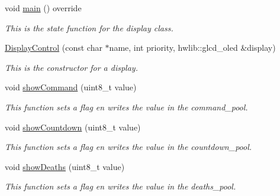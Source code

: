 \begin{DoxyCompactItemize}
void \mbox{\hyperlink{class_display_control_a9707c32249e0a648afc2def818900f30}{main}} () override
\begin{DoxyCompactList}\small\item\em This is the state function for the display class. \end{DoxyCompactList}\item 
\mbox{\hyperlink{class_display_control_a5a24ccc28d6984bda6871ef6d0e4af3f}{Display\+Control}} (const char $\ast$name, int priority, hwlib\+::glcd\+\_\+oled \&display)
\begin{DoxyCompactList}\small\item\em This is the constructor for a display. \end{DoxyCompactList}\item 
\mbox{\label{class_display_control_a78b3ace358fc199a76e00148115f449d}} 
void \mbox{\hyperlink{class_display_control_a78b3ace358fc199a76e00148115f449d}{show\+Command}} (uint8\+\_\+t value)
\begin{DoxyCompactList}\small\item\em This function sets a flag en writes the value in the command\+\_\+pool. \end{DoxyCompactList}\item 
\mbox{\label{class_display_control_adcdd7237b9510e9cb9b2aff9d695ad2e}} 
void \mbox{\hyperlink{class_display_control_adcdd7237b9510e9cb9b2aff9d695ad2e}{show\+Countdown}} (uint8\+\_\+t value)
\begin{DoxyCompactList}\small\item\em This function sets a flag en writes the value in the countdown\+\_\+pool. \end{DoxyCompactList}\item 
\mbox{\label{class_display_control_aee4d1de8dc9b2aab72685cef2ce42d92}} 
void \mbox{\hyperlink{class_display_control_aee4d1de8dc9b2aab72685cef2ce42d92}{show\+Deaths}} (uint8\+\_\+t value)
\begin{DoxyCompactList}\small\item\em This function sets a flag en writes the value in the deaths\+\_\+pool. \end{DoxyCompactList}\item 
\mbox{\label{class_display_control_a6b4ed1ee72406c1ab082b7c6cf900001}} 

\end{DoxyCompactItemize}

